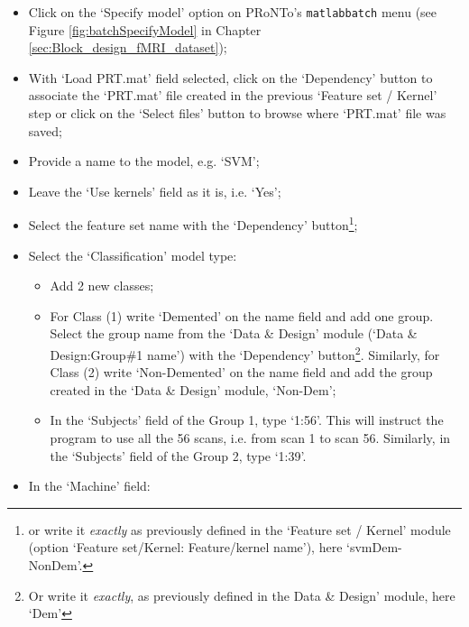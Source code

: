 \begin{itemize}

\item Click on the `Specify model' option on PRoNTo's {\tt matlabbatch} menu (see Figure \ref{fig:batchSpecifyModel} in Chapter \ref{sec:Block_design_fMRI_dataset});
	
\item With `Load PRT.mat' field selected, click on the `Dependency' button to associate the `PRT.mat' file created in the previous `Feature set / Kernel' step or click on the `Select files' button to browse where `PRT.mat' file was saved;

\item Provide a name to the model, e.g. `SVM';   

\item Leave the `Use kernels' field as it is, i.e. `Yes';    

\item Select the feature set name with the `Dependency' button\footnote{or write it {\it exactly} as previously defined in the `Feature set / Kernel' module (option `Feature set/Kernel: Feature/kernel name'), here `svmDem-NonDem'.};    
	
	\item Select the `Classification' model type:
	
		\begin{itemize}
		
		\item Add 2 new classes;
		
		\item For Class (1) write `Demented' on the name field and add one group. Select the group name from the `Data \& Design' module (`Data \& Design:Group\#1 name') with the `Dependency' button\footnote{Or write it {\it exactly}, as previously defined in the Data \& Design' module, here `Dem'}. Similarly, for Class (2) write `Non-Demented' on the name field and add the group created in the `Data \& Design' module, `Non-Dem';	
		
		\item In the `Subjects' field of the Group 1, type `1:56'. This will instruct the program to use all the 56 scans, i.e. from scan 1 to scan 56. Similarly, in the `Subjects' field of the Group 2, type `1:39'.

		\end{itemize}			
		
	\item In the `Machine' field:
	

\end{itemize}

